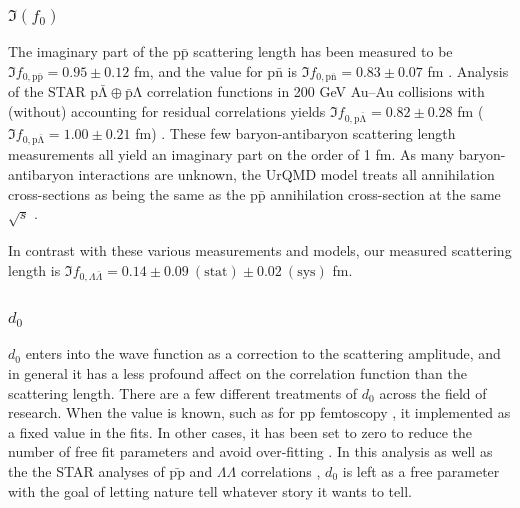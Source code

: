 




\subsubsection{$\Im(f_0)$}
\label{Imf0Result}


The imaginary part of the $\mathrm{p\bar{p}}$ scattering length has been measured to be $\Im f_{0,\mathrm{p\bar{p}}} = 0.95 \pm 0.12$ fm, and the value for $\mathrm{p\bar{n}}$ is $\Im f_{0,\mathrm{p\bar{n}}} = 0.83 \pm 0.07$ fm \cite{Mutchler:1988av}. 
Analysis of the STAR $\mathrm{p\bar{\Lambda} \oplus \bar{p}\Lambda}$ correlation functions in 200 GeV Au--Au \cite{Adams:2005ws} collisions with (without) accounting for residual correlations yields $\Im f_{0,\mathrm{p\bar{\Lambda}}} = 0.82 \pm 0.28$ fm ($\Im f_{0,\mathrm{p\bar{\Lambda}}} = 1.00 \pm 0.21$ fm) \cite{Kisiel:2014mma}.
These few baryon-antibaryon scattering length measurements all yield an imaginary part on the order of 1 fm.
As many baryon-antibaryon interactions are unknown, the UrQMD model treats all annihilation cross-sections as being the same as the $\mathrm{p\bar{p}}$ annihilation cross-section at the same $\sqrt{s}$ \cite{Bleicher:1999xi}.

In contrast with these various measurements and models, our measured scattering length is $\Im f_{0,\Lambda\bar{\Lambda}} = 0.14 \pm 0.09\ (\mathrm{stat}) \pm 0.02\ (\mathrm{sys})$ fm.

\subsubsection{$d_0$}

$d_0$ enters into the wave function as a correction to the scattering amplitude, and in general it has a less profound affect on the correlation function than the scattering length.
There are a few different treatments of $d_0$ across the field of research.
When the value is known, such as for pp femtoscopy \cite{Adam:2015vja}, it implemented as a fixed value in the fits.
In other cases, it has been set to zero to reduce the number of free fit parameters and avoid over-fitting \cite{Kisiel:2014mma, Shapoval:2014yha, Adams:2005ws}.
In this analysis as well as the the STAR analyses of $\bar{\mathrm{pp}}$ and $\Lambda\Lambda$ correlations \cite{Adamczyk:2015hza, Adamczyk:2014vca}, $d_0$ is left as a free parameter with the goal of letting nature tell whatever story it wants to tell.

